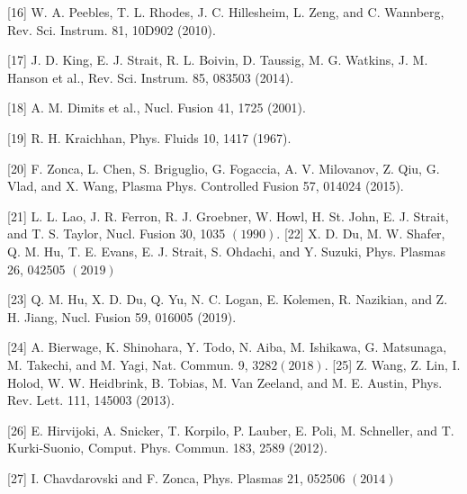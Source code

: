 \documentclass[oneside,onecolumn]{article}
\begin{document}
\begin{sloppypar}
  [16] W. A. Peebles, T. L. Rhodes, J. C. Hillesheim, L. Zeng, and C. Wannberg, Rev. Sci. Instrum. 81, 10D902 (2010).
  
  [17] J. D. King, E. J. Strait, R. L. Boivin, D. Taussig, M. G. Watkins, J. M. Hanson et al., Rev. Sci. Instrum. 85, 083503 (2014).
  
  [18] A. M. Dimits et al., Nucl. Fusion 41, 1725 (2001).
  
  [19] R. H. Kraichhan, Phys. Fluids 10, 1417 (1967).
  
  [20] F. Zonca, L. Chen, S. Briguglio, G. Fogaccia, A. V. Milovanov, Z. Qiu, G. Vlad, and X. Wang, Plasma Phys. Controlled Fusion 57, 014024 (2015).
  
  [21] L. L. Lao, J. R. Ferron, R. J. Groebner, W. Howl, H. St. John, E. J. Strait, and T. S. Taylor, Nucl. Fusion 30, 1035 $(1990)$. [22] X. D. Du, M. W. Shafer, Q. M. Hu, T. E. Evans, E. J. Strait, S. Ohdachi, and Y. Suzuki, Phys. Plasmas 26, 042505 $(2019)$
  
  [23] Q. M. Hu, X. D. Du, Q. Yu, N. C. Logan, E. Kolemen, R. Nazikian, and Z. H. Jiang, Nucl. Fusion 59, 016005 (2019).
  
  [24] A. Bierwage, K. Shinohara, Y. Todo, N. Aiba, M. Ishikawa, G. Matsunaga, M. Takechi, and M. Yagi, Nat. Commun. 9, $3282(2018)$. [25] Z. Wang, Z. Lin, I. Holod, W. W. Heidbrink, B. Tobias, M. Van Zeeland, and M. E. Austin, Phys. Rev. Lett. 111, 145003 (2013).
  
  [26] E. Hirvijoki, A. Snicker, T. Korpilo, P. Lauber, E. Poli, M. Schneller, and T. Kurki-Suonio, Comput. Phys. Commun. 183, 2589 (2012).
  
  [27] I. Chavdarovski and F. Zonca, Phys. Plasmas 21, 052506 $(2014)$
  
  \end{sloppypar}	
  
\end{document}
